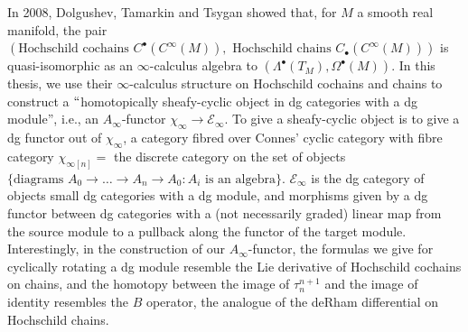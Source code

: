 In 2008, Dolgushev, Tamarkin and Tsygan showed that, for $M$ a smooth real manifold, the pair $(\textrm{Hochschild cochains }C^\bullet(C^\infty(M)), \textrm{ Hochschild chains }C_\bullet(C^\infty(M)))$ is quasi-isomorphic as an $\infty$-calculus algebra to $(\Lambda^\bullet(T_M), \Omega^\bullet(M))$. In this thesis, we use their $\infty$-calculus structure on Hochschild cochains and chains to construct a $``$homotopically sheafy-cyclic object in dg categories with a dg module'', i.e., an $A_\infty$-functor $\chi_\infty \to \mathcal{E}_\infty$. To give a sheafy-cyclic object is to give a dg functor out of $\chi_\infty$, a category fibred over Connes' cyclic category with fibre category $\chi_{\infty [n]} =$ the discrete category on the set of objects $\{\textrm{diagrams }A_0 \to \dots \to A_n \to A_0: A_i \textrm{ is an algebra} \}$. $\mathcal{E}_\infty$ is the dg category of objects small dg categories with a dg module, and morphisms given by a dg functor between dg categories with a (not necessarily graded) linear map from the source module to a pullback along the functor of the target module. Interestingly, in the construction of our $A_\infty$-functor, the formulas we give for cyclically rotating a dg module resemble the Lie derivative of Hochschild cochains on chains, and the homotopy between the image of $\tau_n^{n+1}$ and the image of identity resembles the $B$ operator, the analogue of the deRham differential on Hochschild chains.